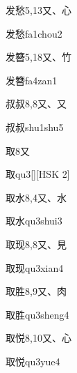 \begin{entry}{发愁}{5,13}{⼜、⼼}
  \begin{phonetics}{发愁}{fa1chou2}
  \end{phonetics}
\end{entry}

\begin{entry}{发簪}{5,18}{⼜、⽵}
  \begin{phonetics}{发簪}{fa4zan1}
  \end{phonetics}
\end{entry}

\begin{entry}{叔叔}{8,8}{⼜、⼜}
  \begin{phonetics}{叔叔}{shu1shu5}
  \end{phonetics}
\end{entry}

\begin{entry}{取}{8}{⼜}
  \begin{phonetics}{取}{qu3}[][HSK 2]
  \end{phonetics}
\end{entry}

\begin{entry}{取水}{8,4}{⼜、⽔}
  \begin{phonetics}{取水}{qu3shui3}
  \end{phonetics}
\end{entry}

\begin{entry}{取现}{8,8}{⼜、⾒}
  \begin{phonetics}{取现}{qu3xian4}
  \end{phonetics}
\end{entry}

\begin{entry}{取胜}{8,9}{⼜、⾁}
  \begin{phonetics}{取胜}{qu3sheng4}
  \end{phonetics}
\end{entry}

\begin{entry}{取悦}{8,10}{⼜、⼼}
  \begin{phonetics}{取悦}{qu3yue4}
  \end{phonetics}
\end{entry}

